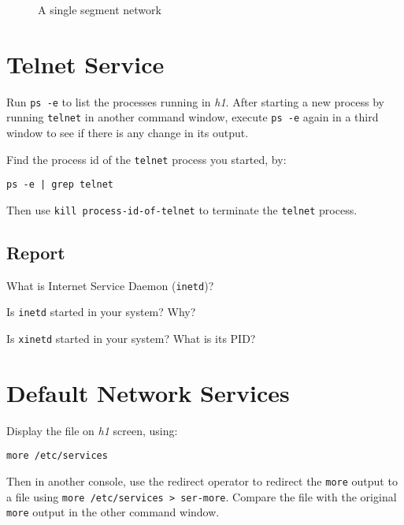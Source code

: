 \documentclass{../UTNetLab}
\begin{document}
\begin{center}
\begin{minipage}{0.48\textwidth}
\begin{flushright}
\begin{figure}[H]
                    \caption{A single segment network}        
                \end{figure}
            \end{flushright}
        \end{minipage}
    \end{center}

\section{Telnet Service}
    Run \lstinline{ps -e} to list the processes running in \textit{h1}.
    After starting a new process by running \lstinline{telnet} in another command window, execute \lstinline{ps -e} again in a third window to see if there is any change in its output.

    Find the process id of the \lstinline{telnet} process you started, by:
    \begin{lstlisting}
ps -e | grep telnet
    \end{lstlisting}
    Then use \lstinline[emph={process-id-of-telnet}]{kill process-id-of-telnet} to terminate the \lstinline{telnet} process.
    
    \subsection*{Report}
    What is Internet Service Daemon (\lstinline{inetd})?

    Is \lstinline{inetd} started in your system?
    Why?

    Is \lstinline{xinetd} started in your system? What is its PID?

\section{Default Network Services}
    Display the file  on \textit{h1} screen, using:
    \begin{lstlisting}
more /etc/services
    \end{lstlisting}
    Then in another console, use the redirect operator to redirect the \lstinline{more} output to
    a file using \lstinline{more /etc/services > ser-more}. Compare the file  with the original \lstinline{more} output in the other command window.
\end{document}
